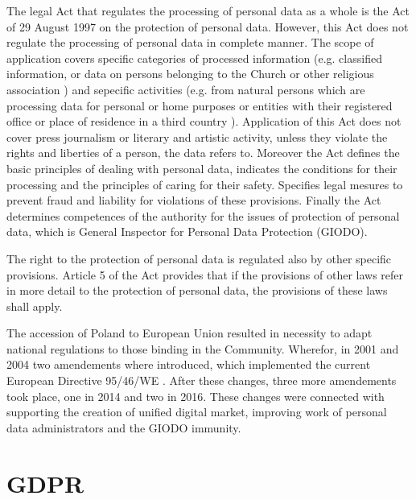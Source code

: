 \documentclass[en, noamssymb]{mgr}
\begin{document}
\indent The legal Act that regulates the processing of personal data as a whole is the Act of 29 August 1997 on the protection of personal data. However, this Act does not regulate the processing of personal data in complete manner. The scope of application covers specific categories of processed information (e.g. classified information, or data on persons belonging to the Church or other religious association \cite{prawo_odo}) and sepecific activities (e.g. from natural persons which are processing data for personal or home purposes or entities with their registered office or place of  residence in a third country \cite{prawo_odo}). Application of this Act does not cover press journalism or literary and artistic activity, unless they violate the rights and liberties of a person, the data refers to. Moreover the Act defines the basic principles of dealing with personal data, indicates the conditions for their processing and the principles of caring for their safety. Specifies legal mesures to prevent fraud and liability for violations of these provisions. Finally the Act determines competences of the authority for the issues of protection of personal data, which is General Inspector for Personal Data Protection (GIODO).

\indent The right to the protection of personal data is regulated also by other specific provisions. Article 5 of the Act provides that if the provisions of other laws refer in more detail to the protection of personal data, the provisions of these laws shall apply.

\indent The accession of Poland to European Union resulted in necessity to adapt national regulations to those binding in the Community. Wherefor, in 2001 and 2004 two amendements where introduced, which implemented the current European Directive 95/46/WE \cite{prawo_odo}. After these changes, three more amendements took place, one in 2014 and two in 2016. These changes were connected with supporting the creation of unified digital market, improving work of personal data administrators and the GIODO immunity.


\chapter{GDPR} \label{sec:sekcjaRODO}
\end{document}
